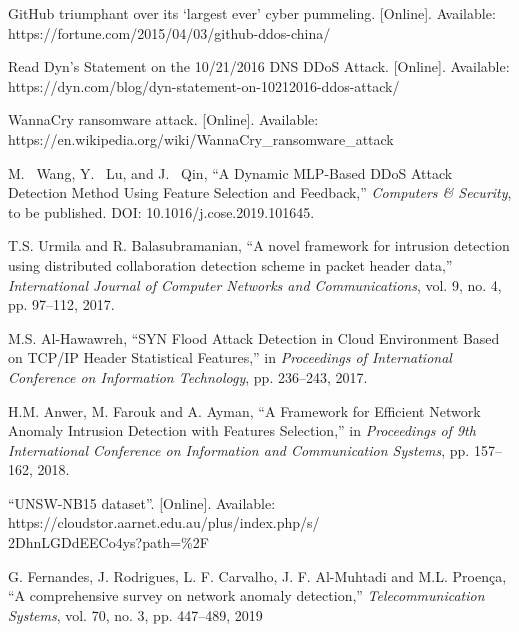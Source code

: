 \documentclass{ieeeaccess}
\theoremstyle{definition}
\begin{document}
% 
\begin{thebibliography}{00}
    GitHub triumphant over its ‘largest ever’ cyber pummeling. [Online]. Available: \\ https://fortune.com/2015/04/03/github-ddos-china/

    Read Dyn’s Statement on the 10/21/2016 DNS DDoS Attack. [Online]. Available: \\ https://dyn.com/blog/dyn-statement-on-10212016-ddos-attack/

    WannaCry ransomware attack. [Online]. Available: \\ https://en.wikipedia.org/wiki/WannaCry\_ransomware\_attack

    M. ~Wang, Y. ~Lu, and J. ~Qin, ``A Dynamic MLP-Based DDoS Attack Detection Method Using Feature Selection and Feedback,'' \emph{Computers \& Security}, to be published. DOI: 10.1016/j.cose.2019.101645.

    T.S. Urmila and R. Balasubramanian, ``A novel framework for intrusion detection using distributed collaboration detection scheme in packet header data,'' \emph{International Journal of Computer Networks and Communications}, vol. 9, no. 4, pp. 97--112, 2017.

    M.S. Al-Hawawreh, ``SYN Flood Attack Detection in Cloud Environment Based on TCP/IP Header Statistical Features,'' in \emph{Proceedings of International Conference on Information Technology}, pp. 236--243, 2017.

    H.M. Anwer, M. Farouk and A. Ayman, ``A Framework for Efficient Network Anomaly Intrusion Detection with Features Selection,'' in \emph{Proceedings of 9th International Conference on Information and Communication Systems}, pp. 157--162, 2018.

    ``UNSW-NB15 dataset''. [Online]. Available: \\https://cloudstor.aarnet.edu.au/plus/index.php/s/\\2DhnLGDdEECo4ys?path=\%2F

    G. Fernandes, J. Rodrigues, L. F. Carvalho, J. F. Al-Muhtadi and M.L. Proença, ``A comprehensive survey on network anomaly detection,'' \emph{Telecommunication Systems}, vol. 70, no. 3, pp. 447--489, 2019


\end{thebibliography}
\end{document}
